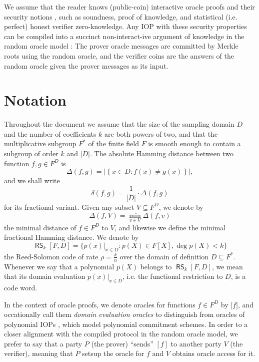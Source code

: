 \documentclass[11pt,article,oneside]{memoir}
\theoremstyle{definition}
\theoremstyle{remark}
\DeclareMathOperator{\RS}{\mathsf{RS}}
\begin{document}
We assume that the reader knows (public-coin) interactive oracle proofs and their security notions  \cite{IOPs}, such as soundness, proof of knowledge, and statistical (i.e. perfect) honest verifier zero-knowledge. 
Any IOP with these security properties can be compiled into a succinct non-interact-ive argument of knowledge in the random oracle model \cite{IOPs}:
The prover oracle messages are committed by Merkle roots using the random oracle, and the verifier coins are the answers of the random oracle given the prover messages as its input.


\section{Notation}
Throughout the document we assume that the size of the sampling domain $D$ and the number of coefficients $k$ are both powers of two, and that the multiplicative subgroup $F^*$ of the finite field $F$ is smooth enough to contain a subgroup of order $k$ and $|D|$. 
The absolute Hamming distance between two function $f,g\in F^D$ is
\begin{equation*}
\Delta(f, g) = \big|\left\{x\in D: f(x)\neq g(x)\right\}\big|,
\end{equation*}
and we shall write 
\[
\delta(f, g) = \frac{1}{|D|}\cdot \Delta(f,g)
\] 
for its fractional variant.
Given any subset $V\subseteq F^D$, we denote by
\[
\Delta(f, V) = \min_{v\in V} \Delta(f,v)
\]
the minimal distance of $f\in F^D$ to $V$, and likewise we define the minimal fractional Hamming distance.
We denote by
\begin{equation*}
\RS_k[F,D] = \big\{ \left.p(x)\right|_{x\in D} : p(X)\in F[X], \deg p(X) < k\big\}
\end{equation*}
the Reed-Solomon code of rate $\rho = \frac{k}{n}$ over the domain of definition $D\subseteq F^*$. 
Whenever we say that a polynomial $p(X)$ belongs to $\RS_k[F,D]$, we mean that its domain evaluation $p(x)|_{x\in D}$, i.e. the functional restriction to $D$, is a code word. 

In the context of oracle proofs, we denote oracles for  functions $f\in F^D$ by
$\big[ f \big]$, and occationally call them \textit{domain evaluation oracles} to distinguish from oracles of polynomial IOPs \cite{DARK}, which model polynomial commitment schemes.
In order to a closer alignment with the compiled protocol in the random oracle model, we prefer to say that a party $P$ (the prover) ``sends'' $[f]$ to another party $V$ (the verifier), meaning that $P$ setsup the oracle for $f$ and $V$ obtains oracle access for it.
\end{document}
